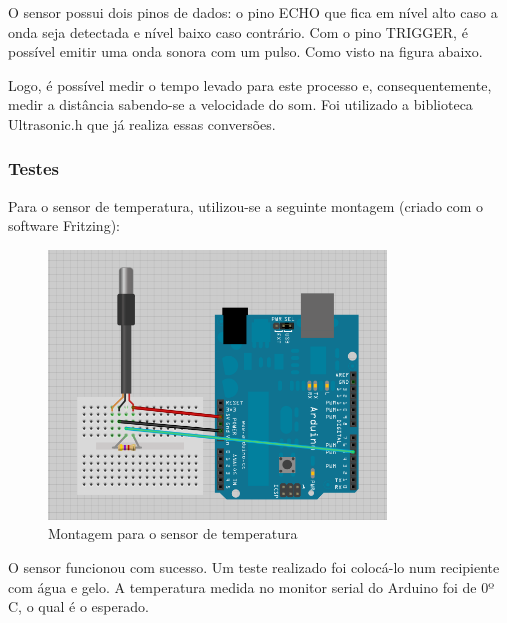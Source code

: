 
O sensor possui dois pinos de dados: o pino ECHO que fica em nível alto caso a onda seja detectada e nível baixo caso contrário. Com o pino TRIGGER, é possível emitir uma onda sonora com um pulso. Como visto na figura abaixo. 


Logo, é possível medir o tempo levado para este processo e, consequentemente, medir a distância sabendo-se a velocidade do som. Foi utilizado a biblioteca Ultrasonic.h que já realiza essas conversões.

\subsubsection{Testes}

Para o sensor de temperatura, utilizou-se a seguinte montagem (criado com o software Fritzing):

\begin{figure}[H]
	\centering
    \includegraphics[width=0.8\textwidth]{figuras/fritzing_temp}
    \caption{Montagem para o sensor de temperatura}
    \label{fig:fritzing_temp}
\end{figure}

O sensor funcionou com sucesso. Um teste realizado foi colocá-lo num recipiente com água e gelo. A temperatura medida no monitor serial do Arduino foi de 0º C, o qual é o esperado.

